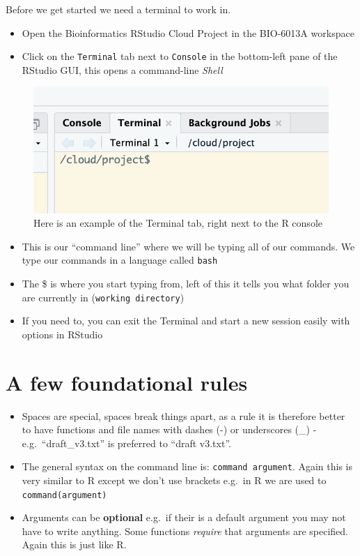 \documentclass[
]{book}
\providecommand{\tightlist}{%
  \setlength{\itemsep}{0pt}\setlength{\parskip}{0pt}}
\begin{document}
Before we get started we need a terminal to work in.

\begin{itemize}
\tightlist
\item
  Open the Bioinformatics RStudio Cloud Project in the BIO-6013A workspace
\item
  Click on the \texttt{Terminal} tab next to \texttt{Console} in the bottom-left pane of the RStudio GUI, this opens a command-line \emph{Shell}
\end{itemize}

\begin{figure}

{\centering \includegraphics[width=0.8\linewidth]{images/terminal} 

}

\caption{Here is an example of the Terminal tab, right next to the R console}\label{fig:unnamed-chunk-4}
\end{figure}

\begin{itemize}
\item
  This is our ``command line'' where we will be typing all of our commands. We type our commands in a language called \texttt{bash}
\item
  The \$ is where you start typing from, left of this it tells you what folder you are currently in (\texttt{working\ directory})
\item
  If you need to, you can exit the Terminal and start a new session easily with options in RStudio
\end{itemize}

\hypertarget{a-few-foundational-rules}{%
\section{A few foundational rules}\label{a-few-foundational-rules}}

\begin{itemize}
\item
  Spaces are special, spaces break things apart, as a rule it is therefore better to have functions and file names with dashes (-) or underscores (\_) - e.g.~``draft\_v3.txt'' is preferred to ``draft v3.txt''.
\item
  The general syntax on the command line is: \texttt{command\ argument}. Again this is very similar to R except we don't use brackets e.g.~in R we are used to \texttt{command(argument)}
\item
  Arguments can be \textbf{optional} e.g.~if their is a default argument you may not have to write anything. Some functions \emph{require} that arguments are specified. Again this is just like R.
\end{itemize}
\end{document}
